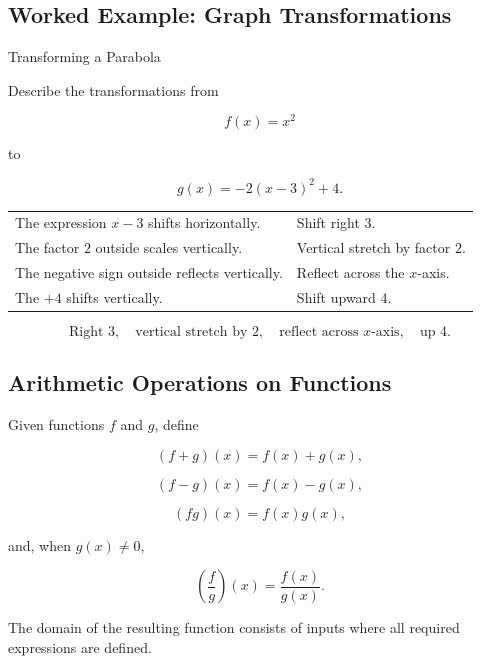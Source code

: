 \subsection{Worked Example: Graph Transformations}
\label{subsec:worked-transformations}

\begin{workedexamplebox}{Transforming a Parabola}

Describe the transformations from

\[ f(x)=x^2 \]

to

\[ g(x)=-2(x-3)^2+4. \]

\begin{tabularx}{\textwidth}{@{}>{\raggedright\arraybackslash}p{}X@{}}
The expression \(x-3\) shifts horizontally. &
Shift right \(3\).\\
The factor \(2\) outside scales vertically. &
Vertical stretch by factor \(2\).\\
The negative sign outside reflects vertically. &
Reflect across the \(x\)-axis.\\
The \(+4\) shifts vertically. &
Shift upward \(4\).
\end{tabularx}

\begin{answerbox}
\[
\boxed{\text{Right }3,\quad
\text{vertical stretch by }2,\quad
\text{reflect across \(x\)-axis},\quad
\text{up }4.}
\]
\end{answerbox}
\end{workedexamplebox}

\subsection{Arithmetic Operations on Functions}
\label{subsec:function-arithmetic}

Given functions \(f\) and \(g\), define

\[ (f+g)(x)=f(x)+g(x), \]

\[ (f-g)(x)=f(x)-g(x), \]

\[ (fg)(x)=f(x)g(x), \]

and, when \(g(x)\neq0\),

\[ \left(\frac fg\right)(x)=\frac{f(x)}{g(x)}. \]

The domain of the resulting function consists of inputs where all required
expressions are defined.

